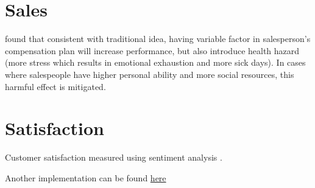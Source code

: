 \documentclass[
]{book}
\begin{document}
\hypertarget{sales}{%
\chapter{Sales}\label{sales}}

\citep{habel2021} found that consistent with traditional idea, having variable factor in salesperson's compensation plan will increase performance, but also introduce health hazard (more stress which results in emotional exhaustion and more sick days). In cases where salespeople have higher personal ability and more social resources, this harmful effect is mitigated.

\hypertarget{satisfaction}{%
\chapter{Satisfaction}\label{satisfaction}}

Customer satisfaction measured using sentiment analysis \citep{kumar2019, wei2020}.

Another implementation can be found \href{https://thesai.org/Downloads/Volume9No2/Paper_16-Customer_Satisfaction_Measurement_using_Sentiment.pdf}{here}

  
\end{document}
